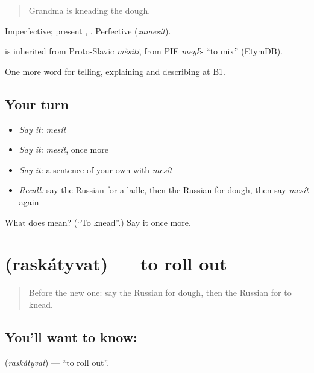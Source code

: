 \begin{quote}
Grandma is kneading the dough.
\end{quote}

Imperfective; present \emph{}, \emph{}. Perfective \emph{} (\emph{zamesít}).

\begin{cousinweb}
\emph{} is inherited from Proto-Slavic \emph{měsiti}, from PIE \emph{mey\'{k}-} \textquotedblleft{}to mix\textquotedblright{} (EtymDB).
\end{cousinweb}

\begin{grammarlens}[title={What you've built}]
One more word for telling, explaining and describing at B1.
\end{grammarlens}

\subsection*{Your turn}
\begin{itemize}
\raggedright
  \item \emph{Say it:} \emph{mesít}
  \item \emph{Say it:} \emph{mesít}, once more
  \item \emph{Say it:} a sentence of your own with \emph{mesít}
  \item \emph{Recall:} say the Russian for a ladle, then the Russian for dough, then say \emph{mesít} again
\end{itemize}

\begin{tcolorbox}[breakable,colback=teal!4,colframe=teal!35!black,title={Before you move on}]
What does  mean? (\textquotedblleft{}To knead\textquotedblright{}.) Say it once more.
\end{tcolorbox}
\section[\texorpdfstring{\ru{раскатывать} (raskátyvat)}{раскатывать (raskátyvat)}]{ (raskátyvat) — to roll out}

\label{lesson:RU-C331-raskatyvat}



\begin{quote}
Before the new one: say the Russian for dough, then the Russian for to knead.
\end{quote}

\subsection*{You'll want to know: }
\textbf{} (\emph{raskátyvat}) — \textquotedblleft{}to roll out\textquotedblright{}.

